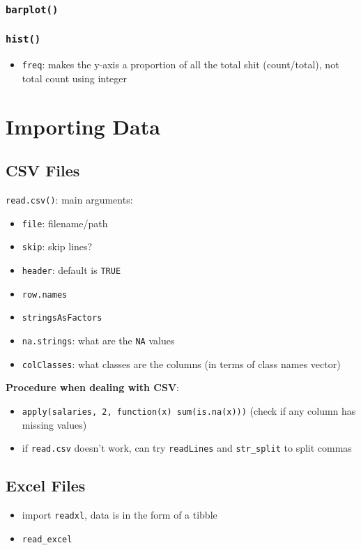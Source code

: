 \documentclass{article}
\begin{document}
\begin{multicols}{2}
\begin{itemize}
\end{itemize}
\subsubsection*{\texttt{barplot()}}
\subsubsection*{\texttt{hist()}}
\begin{itemize}
	\item \texttt{freq}: makes the y-axis a proportion of all the total shit (count/total), not total count using integer
\end{itemize}

\section{Importing Data}

\subsection*{CSV Files}
\texttt{read.csv()}: main arguments:
\begin{itemize}
	\item \texttt{file}: filename/path
	\item \texttt{skip}: skip lines?
	\item \texttt{header}: default is \texttt{TRUE}
	\item \texttt{row.names}
	\item \texttt{stringsAsFactors}
	\item \texttt{na.strings}: what are the \texttt{NA} values
	\item \texttt{colClasses}: what classes are the columns (in terms of class names vector)\\
\end{itemize}
\textbf{Procedure when dealing with CSV}:
\begin{itemize}
	\item \texttt{apply(salaries, 2, function(x) sum(is.na(x)))} (check if any column has missing values)
	\item if \texttt{read.csv} doesn't work, can try \texttt{readLines} and \texttt{str\_split} to split commas
\end{itemize}


\subsection*{Excel Files}
\begin{itemize}
	\item import \texttt{readxl}, data is in the form of a tibble
	\item \texttt{read\_excel}
\end{itemize}
\end{multicols}
\end{document}
